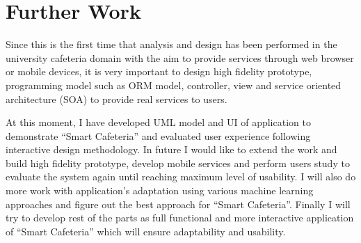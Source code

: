 \section{Further Work}
\label{sec:FurtherWork}
Since this is the first time that analysis and design has been performed in the
university cafeteria domain with the aim to provide services through web browser
or mobile devices, it is very important to design high fidelity prototype,
programming model such as ORM model, controller, view and service oriented
architecture (SOA) to provide real services to users.


At this moment, I have developed UML model and UI of application to demonstrate
``Smart Cafeteria'' and evaluated user experience following interactive design
methodology. In future I would like to extend the work and build high fidelity
prototype, develop mobile services and perform users study to evaluate the
system again until reaching maximum level of usability. I will also do more work
with application's adaptation using various machine learning approaches and
figure out the best approach for ``Smart Cafeteria''. Finally I will try to
develop rest of the parts as full functional and more interactive application of
``Smart Cafeteria'' which will ensure adaptability and usability.

